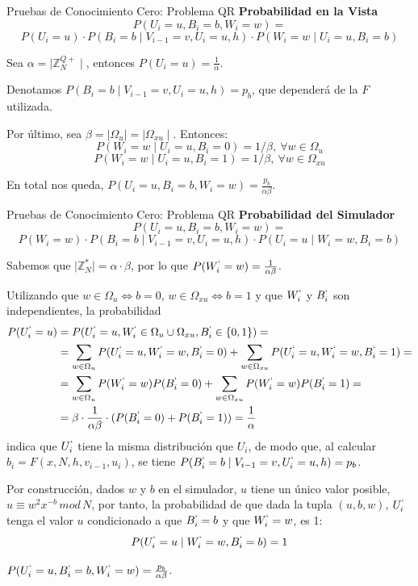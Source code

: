 \documentclass{beamer}
\begin{document}
\begin{frame}{Pruebas de Conocimiento Cero: Problema QR}
	\textbf{Probabilidad en la Vista}
	\[
	P(U_i=u, B_i=b, W_i=w) = 
	\]
	\[ P(U_i=u)\cdot P(B_i=b \mid V_{i-1}=v, U_i=u,h) \cdot P(W_i=w \mid U_i=u, B_i=b) \]
	
	Sea $\alpha = \mid \mathbb{Z}^{Q+}_N \mid $, entonces $P(U_i=u) = \frac{1}{\alpha}$.
	
	Denotamos $ P(B_i=b \mid V_{i-1}=v, U_i=u,h)=p_b$, que dependerá de la $F$ utilizada.
	
	Por último, sea $\beta = \mid \Omega_u \mid = \mid \Omega_{xu} \mid $. Entonces:
	\[P(W_i=w \mid U_i=u, B_i=0) = 1/\beta,\ \forall w \in \Omega_u\]
	\[P(W_i=w \mid U_i=u, B_i=1) = 1/\beta,\ \forall w \in \Omega_{xu}\]
	
	En total nos queda, $P(U_i=u, B_i=b, W_i=w) = \frac{p_b}{\alpha \beta}$.
\end{frame}


\begin{frame}{Pruebas de Conocimiento Cero: Problema QR}
	\textbf{Probabilidad del Simulador}
	\[P(U_i=u, B_i=b, W_i=w) = \]
	\[P(W_i=w)\cdot P(B_i=b \mid V_{i-1}=v, U_i=u,h) \cdot P(U_i=u \mid W_i=w, B_i=b)\]
	
	Sabemos que $\mid \mathbb{Z}^*_N \mid = \alpha \cdot \beta $, por lo que $P(W_i^`=w) = \frac{1}{\alpha \beta}$.
	
	Utilizando que $w\in \Omega_u \Leftrightarrow b=0$, $w\in \Omega_{xu} \Leftrightarrow b=1$ y que $W_i^`$ y $B_i^`$ son independientes, la probabilidad
	\begin{align*}
	P(U_i^`=u)  & = P(U_i^`=u, W_i^`\in \Omega_u \cup \Omega_{xu}, B_i^` \in \{0,1\}) = \\
	&= \sum_{w\in \Omega_u} P(U_i^`=u, W_i^`=w, B_i^` = 0) + \sum_{w\in \Omega_{xu}} P(U_i^`=u, W_i^`=w, B_i^` = 1) =  \\
	&= \sum_{w\in \Omega_u} P(W_i^`=w)P(B_i^` = 0) + \sum_{w\in \Omega_{xu}} P(W_i^`=w)P(B_i^` = 1) = \\
	&=\beta \cdot \frac{1}{\alpha \beta} \cdot (P(B_i^`=0) + P(B_i^`=1)) = \frac{1}{\alpha}
	\end{align*}
	indica que $U_i^`$ tiene la misma distribución que $U_i$, de modo que, al calcular $b_{i} = F(x,N,h,v_{i-1},u_{i})$, se tiene 
	$P(B_i^`=b \mid V_{i-1}=v, U_i^`=u,h) = p_b$.
	
	Por construcción, dados $w$ y $b$ en el simulador, $u$ tiene un único valor posible, $u\equiv w^2x^{-b}\,mod\,N$, por tanto, la probabilidad de que dada la tupla $(u, b, w)$, $U_i^`$ tenga el valor $u$ condicionado a que $ B_i^`=b$ y que $W_i^`=w$, es 1:
	\[P(U_i^`=u \mid W_i^`=w, B_i^`=b) = 1\]
	
	$P(U_i^`=u, B_i^`=b, W_i^`=w) = \frac{p_b}{\alpha \beta}$.
\end{frame}
\end{document}
